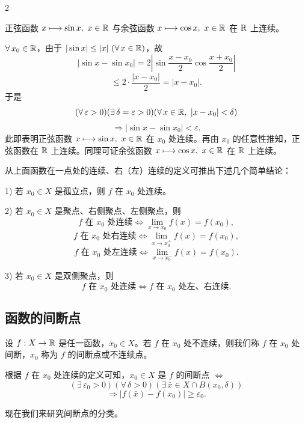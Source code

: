 \begin{sourceexample}{2}

	正弦函数 \(x\longmapsto\sin x,\ x\in\R\) 与余弦函数 \(x\longmapsto\cos x,\ x\in\R\) 在 \(\mathbb{R}\) 上连续。

	\(\forall\,x_0\in\mathbb{R}\)，由于 \(|\sin x|\le|x|\ (\forall\,x\in\mathbb{R})\)，故
	\[
	|\sin x-\sin x_0|=2\left|\sin\frac{x-x_0}{2}\cos\frac{x+x_0}{2}\right|
	\]
	\[
	\le2\cdot\frac{|x-x_0|}{2}=|x-x_0|.
	\]
	于是
	\[
	(\forall\,\varepsilon>0)(\exists\,\delta=\varepsilon>0)(\forall\,x\in\R,\ |x-x_0|<\delta)
	\]
	\[
	\Longrightarrow|\sin x-\sin x_0|<\varepsilon.
	\]
	此即表明正弦函数 \(x\longmapsto\sin x,\ x\in\R\) 在 \(x_0\) 处连续。再由 \(x_0\) 的任意性推知，正弦函数在 \(\mathbb{R}\) 上连续。同理可证余弦函数 \(x\longmapsto\cos x,\ x\in\R\) 在 \(\mathbb{R}\) 上连续。

\end{sourceexample}

从上面函数在一点处的连续、右（左）连续的定义可推出下述几个简单结论：

1) 若 \(x_0\in X\) 是孤立点，则 \(f\) 在 \(x_0\) 处连续。

2) 若 \(x_0\in X\) 是聚点、右侧聚点、左侧聚点，则
\[
f\text{ 在 }x_0\text{ 处连续}\Longleftrightarrow\lim_{x\to x_0}f(x)=f(x_0),
\]
\[
f\text{ 在 }x_0\text{ 处右连续}\Longleftrightarrow\lim_{x\to x_0^+}f(x)=f(x_0),
\]
\[
f\text{ 在 }x_0\text{ 处左连续}\Longleftrightarrow\lim_{x\to x_0^-}f(x)=f(x_0).
\]

3) 若 \(x_0\in X\) 是双侧聚点，则
\[
f\text{ 在 }x_0\text{ 处连续}\Longleftrightarrow f\text{ 在 }x_0\text{ 处左、右连续}.
\]

\subsection{函数的间断点}
	\label{sec:4-5-2}

\begin{mydef*}{}

	设 \(f:X\to\mathbb{R}\) 是任一函数，\(x_0\in X\)。若 \(f\) 在 \(x_0\) 处不连续，则我们称 \(f\) 在 \(x_0\) 处间断，\(x_0\) 称为 \(f\) 的间断点或不连续点。

	根据 \(f\) 在 \(x_0\) 处连续的定义可知，\(x_0\in X\) 是 \(f\) 的间断点 \(\Longleftrightarrow\)
	\[
	(\exists\,\varepsilon_0>0)(\forall\,\delta>0)(\exists\,\bar x\in X\cap B(x_0,\delta))
	\]
	\[
	\Longrightarrow|f(\bar x)-f(x_0)|\ge\varepsilon_0.
	\]

\end{mydef*}

现在我们来研究间断点的分类。

